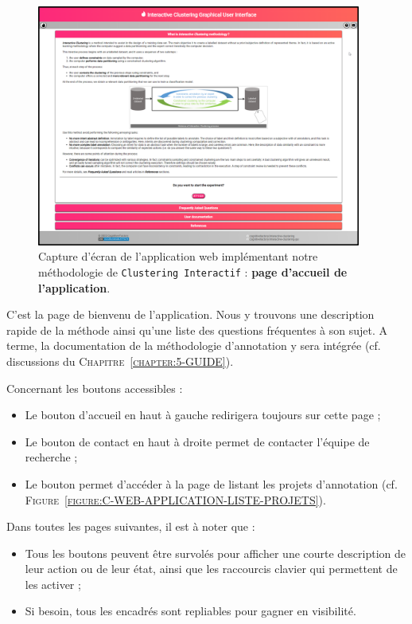 			\begin{figure}[H]
				\centering
				\includegraphics[width=0.95\textwidth]{figures/interactive-clustering-application-accueil-application}
				\caption{
					Capture d'écran de l'application web implémentant notre méthodologie de \texttt{Clustering Interactif} : \textbf{page d'accueil de l'application}.
				}
				\label{figure:C-WEB-APPLICATION-ACCUEIL}
			\end{figure}
			
			C'est la page de bienvenu de l'application.
			Nous y trouvons une description rapide de la méthode ainsi qu'une liste des questions fréquentes à son sujet.
			A terme, la documentation de la méthodologie d'annotation y sera intégrée (cf. discussions du \textsc{Chapitre~\ref{chapter:5-GUIDE}}).
			
			Concernant les boutons accessibles :
			\begin{itemize}
				\item Le bouton d'accueil en haut à gauche redirigera toujours sur cette page ;
				\item Le bouton de contact en haut à droite permet de contacter l'équipe de recherche ;
				\item Le bouton  permet d'accéder à la page de listant les projets d'annotation (cf. \textsc{Figure~\ref{figure:C-WEB-APPLICATION-LISTE-PROJETS}}).
			\end{itemize}
			
			\begin{leftBarInformation}
				Dans toutes les pages suivantes, il est à noter que :
				\begin{itemize}
					\item Tous les boutons peuvent être survolés pour afficher une courte description de leur action ou de leur état, ainsi que les raccourcis clavier qui permettent de les activer ;
					\item Si besoin, tous les encadrés sont repliables pour gagner en visibilité.
				\end{itemize}
			\end{leftBarInformation}
		
